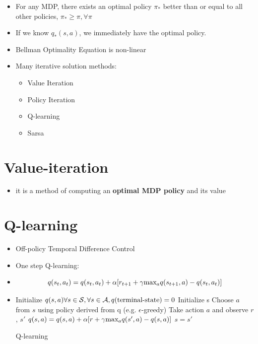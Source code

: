 \documentclass[../main.tex]{subfiles}
\begin{document}
\begin{itemize}
    \item For any MDP, there exists an optimal policy $\pi_{*}$ better than or equal to all other policies, $\pi_{*} \geq \pi, \forall \pi$
    \item If we know $q_{*}(s,a)$, we immediately have the optimal policy.

    \item Bellman Optimality Equation is non-linear
    \item Many iterative solution methods:
    \begin{itemize}
      \item Value Iteration
      \item Policy Iteration
      \item Q-learning
      \item Sarsa
    \end{itemize}

  \end{itemize}

\section{Value-iteration}
  \begin{itemize}
    \item it is a method of computing an \textbf{optimal MDP policy} and its value
  \end{itemize}

\section{Q-learning}
  \begin{itemize}
    \item Off-policy Temporal Difference Control
    \item One step Q-learning:
    \item \begin{equation*}
      q(s_{t}, a_{t}) = q(s_{t}, a_{t}) + \alpha[r_{t+1} + \gamma \text{max}_{a}q(s_{t+1}, a) - q(s_{t}, a_{t})]
    \end{equation*}
    \item \begin{algorithm}[H]
        \SetAlgoLined
        Initialize $q(s,a) \forall s \in \mathcal{S}, \forall s \in \mathcal{A}, q(\text{terminal-state}) = 0$ \;
         {
          Initialize s\;
           {
            Choose $a$ from $s$ using policy derived from q (e.g. $\epsilon$-greedy)\;
            Take action $a$ and observe $r$, $s'$\;
            $q(s,a) = q(s,a) + \alpha[r + \gamma \text{max}_{a} q(s', a) - q(s,a)]$\;
            $s = s'$\;
          }
        }
        \caption{Q-learning}
    \end{algorithm}
  \end{itemize}
\end{document}
